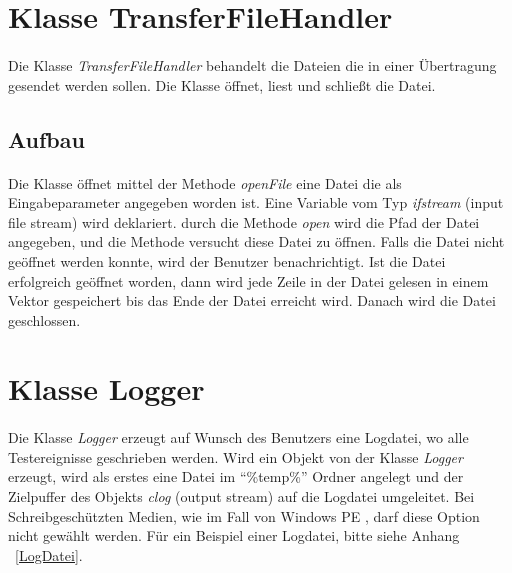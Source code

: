 \newpage


\section{Klasse TransferFileHandler}
\paragraph{}
Die Klasse \textit{TransferFileHandler} behandelt die Dateien die in einer Übertragung gesendet werden sollen. Die Klasse öffnet, liest und schließt die Datei.

\subsection{Aufbau}
\paragraph{}
Die Klasse öffnet mittel der Methode \textit{openFile} eine Datei die als Eingabeparameter angegeben worden ist. Eine Variable vom Typ \textit{ifstream} (input file stream) wird deklariert. durch die Methode \textit{open} wird die Pfad der Datei angegeben, und die Methode versucht diese Datei zu öffnen. Falls die Datei nicht geöffnet werden konnte, wird der Benutzer benachrichtigt. Ist die Datei erfolgreich geöffnet worden, dann wird jede Zeile in der Datei gelesen in einem Vektor gespeichert bis das Ende der Datei erreicht wird. Danach wird die Datei geschlossen.\\


\section{Klasse Logger}\label{LoggerClass}
\paragraph{}
Die Klasse \textit{Logger} erzeugt auf Wunsch des Benutzers eine Logdatei, wo alle Testereignisse geschrieben werden. Wird ein Objekt von der Klasse \textit{Logger} erzeugt, wird als erstes eine Datei im "`\%temp\%"' Ordner angelegt und der Zielpuffer des Objekts \textit{clog} (output stream) auf die Logdatei umgeleitet. Bei Schreibgeschützten Medien, wie im Fall von Windows PE , darf diese Option nicht gewählt werden. Für ein Beispiel einer Logdatei, bitte siehe Anhang ~\ref{LogDatei}.\\



